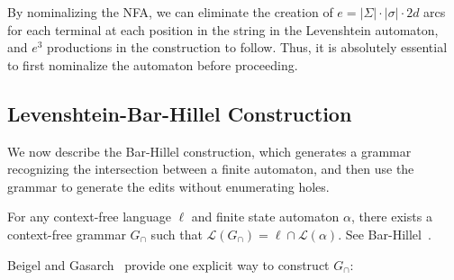 \documentclass[sigplan,review,anonymous,acmsmall]{acmart}\settopmatter{printfolios=false,printccs=false,printacmref=false}
\begin{document}
  By nominalizing the NFA, we can eliminate the creation of $e=|\Sigma|\cdot|\sigma|\cdot2d$ arcs for each terminal at each position in the string in the Levenshtein automaton, and $e^3$ productions in the construction to follow. Thus, it is absolutely essential to first nominalize the automaton before proceeding.

  \subsection{Levenshtein-Bar-Hillel Construction}

  We now describe the Bar-Hillel construction, which generates a grammar recognizing the intersection between a finite automaton, and then use the grammar to generate the edits without enumerating holes.


  \begin{lemma}\label{lemma:bar-hillel}
  For any context-free language $\ell$ and finite state automaton $\alpha$, there exists a context-free grammar $G_\cap$ such that $\mathcal{L}(G_\cap) = \ell \cap \mathcal{L}(\alpha)$. See Bar-Hillel~\cite{bar1961formal}.
  \end{lemma}

  \noindent Beigel and Gasarch~\cite{beigelproof} provide one explicit way to construct $G_\cap$:

\end{document}
